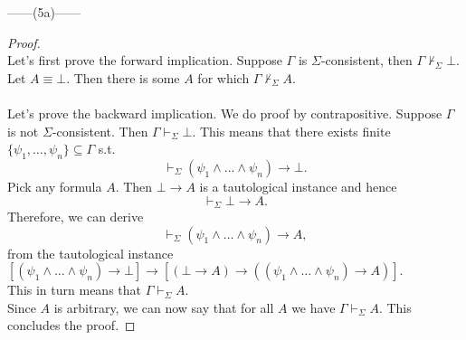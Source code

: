 \documentclass[12pt]{article}
\newcommand{\dr}{\vdash_{\Sigma}}
\newcommand{\ndr}{\nvdash_{\Sigma}}
\begin{document}
\newpage
\noindent
\begin{center}
    ------(5a)------
\end{center} 
\begin{proof} $ $\\
    Let's first prove the forward implication.
    Suppose $\Gamma$ is $\Sigma$-consistent, then $\Gamma \ndr \bot$.
    Let $A \equiv \bot$. Then there is some $A$ for which $\Gamma \ndr A$.\\
    \\
    Let's prove the backward implication. We do proof by contrapositive.
    Suppose $\Gamma$ is not $\Sigma$-consistent. Then $\Gamma \dr \bot$.
    This means that there exists finite $\{\psi_1, \dots, \psi_n \} \subseteq \Gamma$ s.t. 
    $$\dr (\psi_1 \land \dots \land \psi_n) \to \bot.$$
    Pick any formula $A$. Then $\bot \to A$ is a tautological instance and hence 
    $$\vdash_{\Sigma} \bot \to A.$$
    Therefore, we can derive 
    $$\dr (\psi_1 \land \dots \land \psi_n) \to A,$$ 
    from the tautological instance
    $[(\psi_1 \land \dots \land \psi_n) \to \bot] \to [(\bot \to A) \to ((\psi_1 \land \dots \land \psi_n) \to A)].$\\
    This in turn means that $\Gamma \dr A$.\\
    Since $A$ is arbitrary, we can now say that for all $A$ we have $\Gamma \vdash_{\Sigma} A$. This concludes the proof.
\end{proof}
\end{document}
